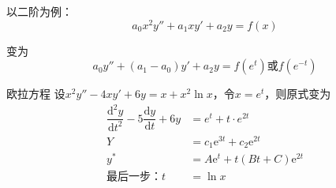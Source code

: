 \documentclass[math]{amznotes}
\begin{document}
以二阶为例：
\begin{equation*}
    a_0x^2y'' + a_1xy' + a_2y = f(x)
\end{equation*}

变为
\begin{equation*}
    a_0y'' + (a_1 - a_0)y' + a_2y = f(e^t)\text{或}f(e^{-t})
\end{equation*}
\begin{exbox}{欧拉方程}{}
    设$x^2y'' - 4xy' + 6y = x + x^2\ln x$，令$x = e^t$，则原式变为
    \begin{align*}
        \dfrac{\mathrm{d}^2 y}{\mathrm{d}t^2} - 5\dfrac{\mathrm{d}y}{\mathrm{d}t} + 6y &= e^t + t \cdot e^{2t}\\
        Y &= c_1 \mathrm{e}^{3t} + c_2 \mathrm{e}^{2t}\\
        y^* &= A\mathrm{e}^{t} + t(Bt + C)\mathrm{e}^{2t}\\
        \text{最后一步：}t &= \ln x\\
    \end{align*}
\end{exbox}
\end{document}
